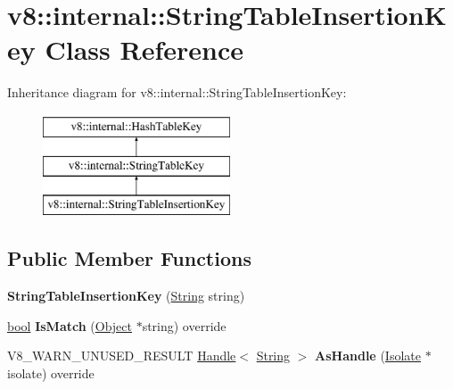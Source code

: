 \hypertarget{classv8_1_1internal_1_1StringTableInsertionKey}{}\section{v8\+:\+:internal\+:\+:String\+Table\+Insertion\+Key Class Reference}
\label{classv8_1_1internal_1_1StringTableInsertionKey}
Inheritance diagram for v8\+:\+:internal\+:\+:String\+Table\+Insertion\+Key\+:\begin{figure}[H]
\begin{center}
\leavevmode
\includegraphics[height=3.000000cm]{classv8_1_1internal_1_1StringTableInsertionKey}
\end{center}
\end{figure}
\subsection*{Public Member Functions}
\begin{DoxyCompactItemize}
\item 
\mbox{\label{classv8_1_1internal_1_1StringTableInsertionKey_a7f8060692fa29072dee2aab9156b03a3}} 
{\bfseries String\+Table\+Insertion\+Key} (\mbox{\hyperlink{classv8_1_1internal_1_1String}{String}} string)
\item 
\mbox{\label{classv8_1_1internal_1_1StringTableInsertionKey_abebd8e6ff32c34730fbf05046da35824}} 
\mbox{\hyperlink{classbool}{bool}} {\bfseries Is\+Match} (\mbox{\hyperlink{classv8_1_1internal_1_1Object}{Object}} $\ast$string) override
\item 
\mbox{\label{classv8_1_1internal_1_1StringTableInsertionKey_a5f08111fa532b52e89f0693064e323e7}} 
V8\+\_\+\+W\+A\+R\+N\+\_\+\+U\+N\+U\+S\+E\+D\+\_\+\+R\+E\+S\+U\+LT \mbox{\hyperlink{classv8_1_1internal_1_1Handle}{Handle}}$<$ \mbox{\hyperlink{classv8_1_1internal_1_1String}{String}} $>$ {\bfseries As\+Handle} (\mbox{\hyperlink{classv8_1_1internal_1_1Isolate}{Isolate}} $\ast$isolate) override
\end{DoxyCompactItemize}
